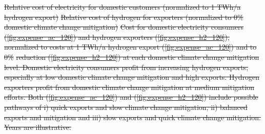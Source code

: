 \documentclass[5p,numafflabel]{elsarticle}
\newcommand{\co}{\ce{CO2}~}
\def\co{CO${}_2${\:}}
\providecommand{\DIFdeltex}[1]{{\protect\color{red}\sout{#1}}}                      %
\providecommand{\DIFdelbegin}{} %
\providecommand{\DIFdelend}{} %
\providecommand{\DIFdelFL}[1]{\DIFdel{#1}} %
\providecommand{\DIFdel}[1]{\texorpdfstring{\DIFdeltex{#1}}{}} %
\newcommand{\DIFscaledelfig}{0.5}
\newlength{\DIFdelgraphicswidth} %
\newlength{\DIFdelgraphicsheight} %
\newcommand{\DIFdelincludegraphics}[2][]{%
\sbox{\DIFdelgraphicsbox}{\DIFOincludegraphics[#1]{#2}}%
\settoboxwidth{\DIFdelgraphicswidth}{\DIFdelgraphicsbox} %
\settoboxtotalheight{\DIFdelgraphicsheight}{\DIFdelgraphicsbox} %
\scalebox{\DIFscaledelfig}{%
\parbox[b]{\DIFdelgraphicswidth}{\usebox{\DIFdelgraphicsbox}\\[-\baselineskip] \rule{\DIFdelgraphicswidth}{0em}}\llap{\resizebox{\DIFdelgraphicswidth}{\DIFdelgraphicsheight}{%
\setlength{\unitlength}{\DIFdelgraphicswidth}%
\begin{picture}(1,1)%
\thicklines\linethickness{2pt} %
{\color[rgb]{1,0,0}\put(0,0){\framebox(1,1){}}}%
{\color[rgb]{1,0,0}\put(0,0){\line( 1,1){1}}}%
{\color[rgb]{1,0,0}\put(0,1){\line(1,-1){1}}}%
\end{picture}%
}\hspace*{3pt}}} %
} %
\DeclareRobustCommand{\DIFdelbegin}{\DIFOdelbegin \let\includegraphics\DIFdelincludegraphics} %
\DeclareRobustCommand{\DIFdelend}{\DIFOaddend \let\includegraphics\DIFOincludegraphics} %
\begin{document}
\DIFdelbegin %
{%
\DIFdelFL{Relative cost of electricity for domestic customers (normalized to 1 TWh/a hydrogen export)}}
{%
\DIFdelFL{Relative cost of hydrogen for exporters (normalized to 0\% domestic climate change mitigation)}}
{%
\DIFdelFL{Cost for domestic electricity consumers (\ref{fig:expense_ac_120}) and hydrogen exporters (\ref{fig:expense_h2_120}),
    normalized to costs at 1 TWh/a hydrogen export (\ref{fig:expense_ac_120}) and
    to 0\% }%
\DIFdelFL{reduction (\ref{fig:expense_h2_120})
    at each domestic climate change mitigation level. Domestic electricity consumers profit from increasing hydrogen exports, especially at low domestic climate change mitigation and high exports. Hydrogen exporters profit from domestic climate change mitigation at medium mitigation efforts. Both (\ref{fig:expense_ac_120}) and (\ref{fig:expense_h2_120}) include possible pathways of i) quick exports and slow climate change mitigation, ii) balanced exports and mitigation and iii) slow exports and quick climate change mitigation. Years are illustrative.}}

\DIFdelend %
\end{document}
